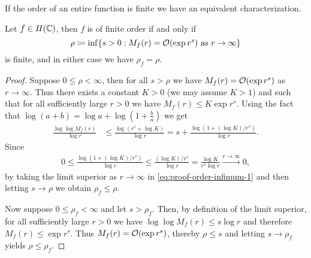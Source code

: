If the order of an entire function is finite we have an equivalent characterization.

\begin{proposition} \label{prop:order-infimum}
    Let $f \in H(\mathbb{C})$, then $f$ is of finite order if and only if
    \begin{equation}
        \rho \coloneqq \inf \{ s > 0 : M_f(r) = \mathcal{O}(\exp r^s) \textrm{ as } r \to \infty \}
    \end{equation}
    is finite, and in either case we have $\rho_f = \rho$.
\end{proposition}

\begin{proof}
    Suppose $0 \leq \rho < \infty$, then for all $s > \rho$ we have $M_f(r) = \mathcal{O}(\exp r^s)$ as $r \to \infty$. Thus there exists a constant $K > 0$ (we may assume $K > 1$) and such that for all sufficiently large $r > 0$ we have $M_f(r) \leq K \exp r^s$. Using the fact that $\log (a+b) = \log a + \log (1 + \frac{b}{a})$ we get
    \begin{align*}
        \frac{\log \log M_f(r)}{\log r} &\leq \frac{\log (r^s + \log K)}{\log r} = s + \frac{\log (1 + (\log K) / r^s)}{\log r}. \tag{\textasteriskcentered} \label{eq:proof-order-infimum-1}
    \end{align*}
    Since
    \begin{align*}
        0 \leq \frac{\log (1 + (\log K) / r^s)}{\log r} \leq \frac{(\log K) / r^s}{\log r} = \frac{\log K}{r^s \log r} \xrightarrow{r \to \infty} 0,
    \end{align*}
    by taking the limit superior as $r \to \infty$ in \eqref{eq:proof-order-infimum-1} and then letting $s \to \rho$ we obtain $\rho_f \leq \rho$.

    Now suppose $0 \leq \rho_f < \infty$ and let $s > \rho_f$. Then, by definition of the limit superior, for all sufficiently large $r > 0$ we have $ \log \log M_f(r) \leq s \log r$ and therefore $M_f(r) \leq \exp r^s$. Thus $M_f(r) = \mathcal{O}(\exp r^s)$, thereby $\rho \leq s$ and letting $s \to \rho_f$ yields $\rho \leq \rho_f$.
\end{proof}


